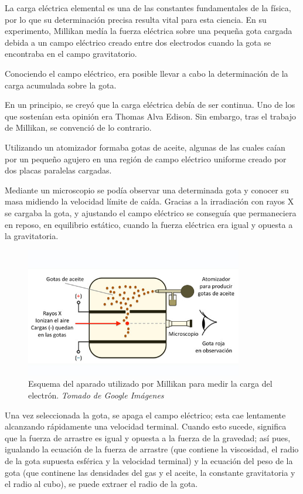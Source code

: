 \documentclass[journal]{IEEEtran}
\begin{document}
La carga eléctrica elemental es una de las constantes fundamentales de la física, por lo que su determinación precisa resulta vital para esta ciencia. En su experimento, Millikan medía la fuerza eléctrica sobre una pequeña gota cargada debida a un campo eléctrico creado entre dos electrodos cuando la gota se encontraba en el campo gravitatorio.

Conociendo el campo eléctrico, era posible llevar a cabo la determinación de la carga acumulada sobre la gota.

En un principio, se creyó que la carga eléctrica debía de ser continua. Uno de los que sostenían esta opinión era Thomas Alva Edison. Sin embargo, tras el trabajo de Millikan, se convenció de lo contrario.

Utilizando un atomizador formaba gotas de aceite, algunas de las cuales caían por un pequeño agujero en una región de campo eléctrico uniforme creado por dos placas paralelas cargadas. 

Mediante un microscopio se podía observar una determinada gota y conocer su masa midiendo la velocidad límite de caída. Gracias a la irradiación con rayos X se cargaba la gota, y ajustando el campo eléctrico se conseguía que permaneciera en reposo, en equilibrio estático, cuando la fuerza eléctrica era igual y opuesta a la gravitatoria. 

\begin{center}
  \begin{figure}[h!]
  \includegraphics[width=95mm]{gota_aceite.jpg}
  \caption{Esquema del aparado utilizado por Millikan para medir la carga del electrón. \emph{Tomado de Google Imágenes}}
  \end{figure}
\end{center}

Una vez seleccionada la gota, se apaga el campo eléctrico; esta cae lentamente alcanzando rápidamente una velocidad terminal. Cuando esto sucede, significa que la fuerza de arrastre es igual y opuesta a la fuerza de la gravedad; así pues, igualando la ecuación de la fuerza de arrastre (que contiene la viscosidad, el radio de la gota supuesta esférica y la velocidad terminal) y la ecuación del peso de la gota (que continene las densidades del gas y el aceite, la constante gravitatoria y el radio al cubo), se puede extraer el radio de la gota.
\end{document}
